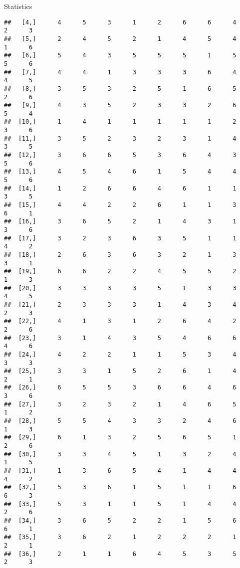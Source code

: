 \documentclass[
  ignorenonframetext,
]{beamer}
\begin{document}
\begin{frame}[fragile]{Statistics}
\begin{verbatim}
##   [4,]      4      5      3      1      2      6      6      4      2      3
##   [5,]      2      4      5      2      1      4      5      4      1      6
##   [6,]      5      4      3      5      5      5      1      5      5      6
##   [7,]      4      4      1      3      3      3      6      4      4      5
##   [8,]      3      5      3      2      5      1      6      5      2      6
##   [9,]      4      3      5      2      3      3      2      6      5      4
##  [10,]      1      4      1      1      1      1      1      2      3      6
##  [11,]      3      5      2      3      2      3      1      4      3      5
##  [12,]      3      6      6      5      3      6      4      3      5      6
##  [13,]      4      5      4      6      1      5      4      4      5      6
##  [14,]      1      2      6      6      4      6      1      1      3      5
##  [15,]      4      4      2      2      6      1      1      3      6      1
##  [16,]      3      6      5      2      1      4      3      1      3      6
##  [17,]      3      2      3      6      3      5      1      1      4      2
##  [18,]      2      6      3      6      3      2      1      3      3      1
##  [19,]      6      6      2      2      4      5      5      2      1      3
##  [20,]      3      3      3      3      5      1      3      3      4      5
##  [21,]      2      3      3      3      1      4      3      4      2      3
##  [22,]      4      1      3      1      2      6      4      2      2      6
##  [23,]      3      1      4      3      5      4      6      6      4      6
##  [24,]      4      2      2      1      1      5      3      4      3      3
##  [25,]      3      3      1      5      2      6      1      4      2      1
##  [26,]      6      5      5      3      6      6      4      6      3      6
##  [27,]      3      2      3      2      1      4      6      5      1      2
##  [28,]      5      5      4      3      3      2      4      6      1      3
##  [29,]      6      1      3      2      5      6      5      1      2      6
##  [30,]      3      3      4      5      1      3      2      4      1      5
##  [31,]      1      3      6      5      4      1      4      4      4      2
##  [32,]      5      3      6      1      5      1      1      6      6      3
##  [33,]      5      3      1      1      5      1      4      4      2      6
##  [34,]      3      6      5      2      2      1      5      6      6      1
##  [35,]      3      6      2      1      2      2      2      1      2      1
##  [36,]      2      1      1      6      4      5      3      5      2      3

\end{verbatim}
\end{frame}
\end{document}

